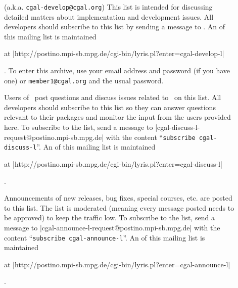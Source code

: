 \begin{description}
\item[] 
     (a.k.a. \texttt{cgal-develop@cgal.org})
     This list is intended for discussing detailed matters 
     about implementation and development issues.  All developers should 
     subscribe to this list by sending a message to
     .
     An  
     of this mailing list is maintained%
     \begin{ccTexOnly}
     at \nonlinkedpath|http://postino.mpi-sb.mpg.de/cgi-bin/lyris.pl?enter=cgal-develop-l|
     \end{ccTexOnly}.  To enter this archive, use your email address and
     password (if you have one) or
     \texttt{member1@cgal.org} and the usual password.  

\item[] 
     Users of \cgal\ post questions and discuss issues
     related to \cgal\ on this list.  All developers should subscribe to this 
     list so they can answer questions relevant to their packages and monitor 
     the input from the users provided here. 
     To subscribe to the list, send a message to
     {\nonlinkedpath|cgal-discuss-l-request@postino.mpi-sb.mpg.de|}
     with the content ``\texttt{subscribe cgal-discuss-l}''.
     An  
     of this mailing list is maintained%
     \begin{ccTexOnly}
     at \nonlinkedpath|http://postino.mpi-sb.mpg.de/cgi-bin/lyris.pl?enter=cgal-discuss-l|
     \end{ccTexOnly}.

\item[] 
     Announcements of new releases, bug fixes, special courses, etc. are posted
     to this list.  The list is moderated (meaning every message posted needs
     to be approved) to keep the traffic low.
     To subscribe to the list, send a message to
     {\nonlinkedpath|cgal-announce-l-request@postino.mpi-sb.mpg.de|}
     with the content ``\texttt{subscribe cgal-announce-l}''.
     An  
     of this mailing list is maintained%
     \begin{ccTexOnly}
     at \nonlinkedpath|http://postino.mpi-sb.mpg.de/cgi-bin/lyris.pl?enter=cgal-announce-l|
     \end{ccTexOnly}.


\end{description}
